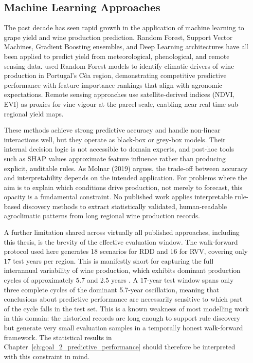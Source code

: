 \subsection{Machine Learning Approaches}\label{sub:machine_learning_approaches}

The past decade has seen rapid growth in the application of machine learning to grape yield and wine production prediction. Random Forest, Support Vector Machines, Gradient Boosting ensembles, and Deep Learning architectures have all been applied to predict yield from meteorological, phenological, and remote sensing data. \citet{Lopes2024} used Random Forest models to identify climatic drivers of wine production in Portugal's C\^oa region, demonstrating competitive predictive performance with feature importance rankings that align with agronomic expectations. Remote sensing approaches use satellite-derived indices (NDVI, EVI) as proxies for vine vigour at the parcel scale, enabling near-real-time sub-regional yield maps.

These methods achieve strong predictive accuracy and handle non-linear interactions well, but they operate as black-box or grey-box models. Their internal decision logic is not accessible to domain experts, and post-hoc tools such as SHAP values approximate feature influence rather than producing explicit, auditable rules. As Molnar (2019) argues, the trade-off between accuracy and interpretability depends on the intended application. For problems where the aim is to explain which conditions drive production, not merely to forecast, this opacity is a fundamental constraint. No published work applies interpretable rule-based discovery methods to extract statistically validated, human-readable agroclimatic patterns from long regional wine production records.

A further limitation shared across virtually all published approaches, including this thesis, is the brevity of the effective evaluation window. The walk-forward protocol used here generates 18 scenarios for RDD and 16 for RVV, covering only 17 test years per region. This is manifestly short for capturing the full interannual variability of wine production, which exhibits dominant production cycles of approximately 5.7 and 2.5 years \citep{Cunha2020}. A 17-year test window spans only three complete cycles of the dominant 5.7-year oscillation, meaning that conclusions about predictive performance are necessarily sensitive to which part of the cycle falls in the test set. This is a known weakness of most modelling work in this domain: the historical records are long enough to support rule discovery but generate very small evaluation samples in a temporally honest walk-forward framework. The statistical results in Chapter~\ref{ch:goal_2_predictive_performance} should therefore be interpreted with this constraint in mind.


